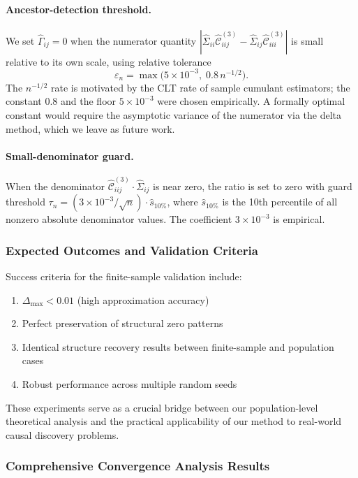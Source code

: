 \documentclass[11pt,a4paper]{article}
\numberwithin{equation}{section}
\begin{document}
\paragraph{Ancestor-detection threshold.}
We set $\hat\Gamma_{ij}=0$ when the numerator quantity
$|\hat\Sigma_{ii}\hat{\mathcal{C}}^{(3)}_{iij}-\hat\Sigma_{ij}\hat{\mathcal{C}}^{(3)}_{iii}|$
is small relative to its own scale, using relative tolerance
\[
  \varepsilon_n = \max\!\bigl(5\times10^{-3},\;0.8\,n^{-1/2}\bigr).
\]
The $n^{-1/2}$ rate is motivated by the CLT rate of sample cumulant
estimators; the constant $0.8$ and the floor $5\times10^{-3}$ were chosen
empirically.  A formally optimal constant would require the asymptotic
variance of the numerator via the delta method, which we leave as future
work.

\paragraph{Small-denominator guard.}
When the denominator $\hat{\mathcal{C}}^{(3)}_{iij}\cdot\hat\Sigma_{ij}$ is
near zero, the ratio is set to zero with guard threshold
$\tau_n = (3\times10^{-3}/\sqrt{n})\cdot\hat{s}_{10\%}$, where
$\hat{s}_{10\%}$ is the 10th percentile of all nonzero absolute denominator
values.  The coefficient $3\times10^{-3}$ is empirical.

\subsubsection{Expected Outcomes and Validation Criteria}

Success criteria for the finite-sample validation include:
\begin{enumerate}[label=(\arabic*)]
\item $\Delta_{\max} < 0.01$ (high approximation accuracy)
\item Perfect preservation of structural zero patterns
\item Identical structure recovery results between finite-sample and population cases
\item Robust performance across multiple random seeds
\end{enumerate}

These experiments serve as a crucial bridge between our population-level theoretical analysis and the practical applicability of our method to real-world causal discovery problems.

\subsubsection{Comprehensive Convergence Analysis Results}
\end{document}
